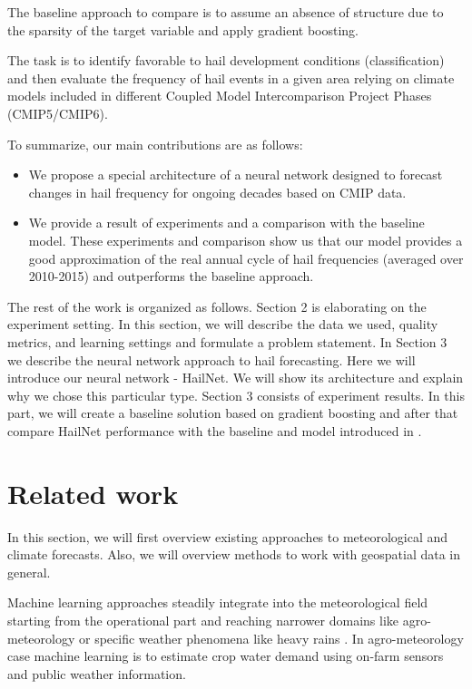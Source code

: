 \documentclass[conference]{IEEEtran}
\begin{document}
The baseline approach to compare is to assume an absence of structure due to the sparsity of the target variable and apply gradient boosting.

 The task is to identify favorable to hail development conditions (classification) and then evaluate the frequency of hail events in a given area relying on climate models included in different Coupled Model Intercomparison Project Phases (CMIP5/CMIP6). 

To summarize, our main contributions are as follows:
\begin{itemize}
    \item We  propose a special architecture of a neural network designed to forecast changes in hail frequency for ongoing decades based on CMIP data.
    \item We provide a result of experiments and a comparison with the baseline model. These experiments and comparison show us that our model provides a good approximation of the real annual cycle of hail frequencies (averaged over 2010-2015) and outperforms the baseline approach.  
\end{itemize}

The rest of the work is organized as follows. Section 2 is elaborating on the experiment setting. In this section, we will describe the data we used, quality metrics, and learning settings and formulate a problem statement. In Section 3 we describe the neural network approach to hail forecasting. Here we will introduce our neural network - HailNet. We will show its architecture and explain why we chose this particular type. Section 3 consists of experiment results. In this part, we will create a baseline solution based on gradient boosting and after that compare HailNet performance with the baseline and model introduced in \cite{PREIN201810}.

\section{Related work}

In this section, we will first overview existing approaches to meteorological and climate forecasts. Also, we will overview methods to work with geospatial data in general. 

Machine learning approaches steadily integrate into the meteorological field starting from the operational part \cite{chase2022machine} and reaching narrower domains like agro-meteorology \cite{kelley2020using} or specific weather phenomena like heavy rains \cite{choi2018development}. In agro-meteorology case machine learning is to estimate crop water demand using on-farm sensors and public weather information.
\end{document}
